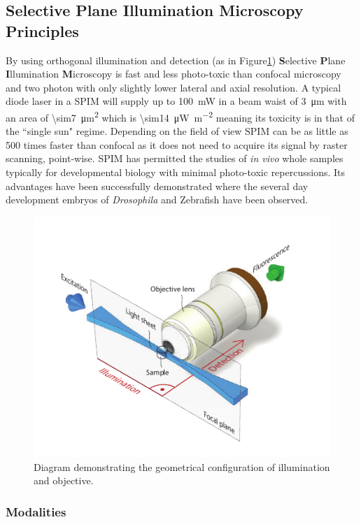 \subsection{Selective Plane Illumination Microscopy Principles}
By using orthogonal illumination and detection (as in Figure\ref{fig:huisken_spim_setup}) \textbf{S}elective \textbf{P}lane \textbf{I}llumination \textbf{M}icroscopy is fast and less photo-toxic than confocal microscopy and two photon with only slightly lower lateral and axial resolution.
A typical diode laser in a SPIM will supply up to \SI{100}{\milli\watt} in a beam waist of \SI{3}{\micro\meter}  with an area of \SI{\sim7}{\micro\meter\squared}  which is \SI{\sim14}{\micro\watt\per\meter\squared} meaning its toxicity is in that of the ``single sun" regime.
Depending on the field of view SPIM can be as little as 500 times faster than confocal as it does not need to acquire its signal by raster scanning, point-wise.
SPIM has permitted the studies of \textit{in vivo} whole samples typically for developmental biology\cite{Huisken2004,Verveer2007a} with minimal photo-toxic repercussions.
Its advantages have been successfully demonstrated where the several day development embryos of \textit{Drosophila} \cite{Huisken2004} and Zebrafish\cite{Mickoleit2014} have been observed.

\begin{figure}
\centering
\includegraphics[width=0.7\linewidth]{huisken_spim_setup}
\caption[Single Plane Imaging Microscope principle]{Diagram demonstrating the geometrical configuration of illumination and objective\cite{Huisken2009}.}
\label{fig:huisken_spim_setup}
\end{figure}

\subsubsection{Modalities}

